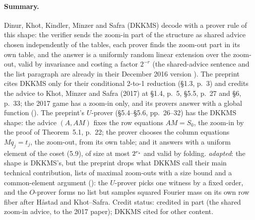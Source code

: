 \documentclass[11pt]{article}
\newcommand{\ploc}[2]{#1}
\newcommand{\sloc}[2]{\cite[#2]{#1}}
\newcommand{\rel}[1]{\textit{#1}}
\begin{document}
\paragraph{Summary.}
Dinur, Khot, Kindler, Minzer and Safra (DKKMS)
\sloc{DinurEtAl2018-Towards2to1}{\S1.4, p.~13; \S5, p.~41} decode with a prover
rule of this shape: the verifier sends the zoom-in part of the structure as
shared advice chosen independently of the tables, each prover finds the zoom-out
part in its own table, and the answer is a uniformly random linear extension
over the zoom-out, valid by invariance and costing a factor $2^{-r}$ (the
shared-advice sentence and the list paragraph are already in their December 2016
version \sloc{DinurEtAl2016-Towards2to1-ECCC}{p.~8}).
The preprint cites DKKMS only for their conditional 2-to-1 reduction
(\ploc{\S1.3, p.~3}{00-introduction.tex:119--122}) and credits the advice to
Khot, Minzer and Safra (2017)
\sloc{KhotMinzerSafra2017-IndependentSets2to2Grassmann}{\S\S3.3--3.4, pp.~20--21}
at \ploc{\S1.4, p.~5}{00-introduction.tex:279--282}, \ploc{\S5.5, p.~27}{04-matrix.tex:445--449}
and \ploc{\S6, p.~33}{05-clean.tex:8--9}; the 2017 game has a zoom-in only, and
its provers answer with a global function
(\sloc{KhotMinzerSafra2017-IndependentSets2to2Grassmann}{Hypothesis~2.12, p.~19; \S5.1, p.~29}).
The preprint's $U$-prover (\ploc{\S5.4--\S5.6, pp.~26--32}{04-matrix.tex:299--749})
has the DKKMS shape: the advice $(A,AM)$ fixes the row equations $AM=S_0$, the
zoom-in by the proof of \ploc{Theorem~5.1, p.~22}{04-matrix.tex:114--118}; the
prover chooses the column equations $Mq_j=t_j$, the zoom-out, from its own table;
and it answers with a uniform element of the coset (5.9), of size at most
$2^{r_{\rm s}}$ and valid by folding. \rel{adapted}: the shape is DKKMS's, but the
preprint drops what DKKMS call their main technical contribution, lists of
maximal zoom-outs with a size bound and a common-element argument
(\sloc{DinurEtAl2018-Towards2to1}{p.~13; Lemma~3.17, pp.~30--31}): the $U$-prover
picks one witness by a fixed order, and the $O$-prover forms no list but samples
squared Fourier mass on its own row fiber after H{\aa}stad and Khot--Safra. Credit
status: credited in part (the shared zoom-in advice, to the 2017 paper); DKKMS
cited for other content.
\end{document}
